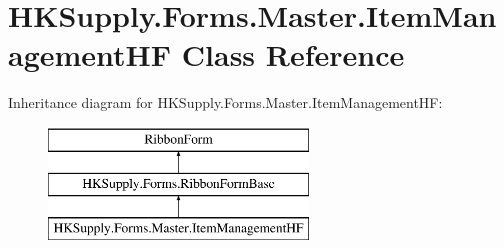 \hypertarget{class_h_k_supply_1_1_forms_1_1_master_1_1_item_management_h_f}{}\section{H\+K\+Supply.\+Forms.\+Master.\+Item\+Management\+HF Class Reference}
\label{class_h_k_supply_1_1_forms_1_1_master_1_1_item_management_h_f}
Inheritance diagram for H\+K\+Supply.\+Forms.\+Master.\+Item\+Management\+HF\+:\begin{figure}[H]
\begin{center}
\leavevmode
\includegraphics[height=3.000000cm]{class_h_k_supply_1_1_forms_1_1_master_1_1_item_management_h_f}
\end{center}
\end{figure}
